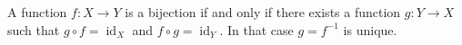 A function $f : X \to Y$ is a bijection if and only if there exists a function $g : Y \to X$ such that $g \circ f = \operatorname{id}_{X}$ and $f \circ g = \operatorname{id}_{Y}$.
In that case $g = f^{-1}$ is unique.
